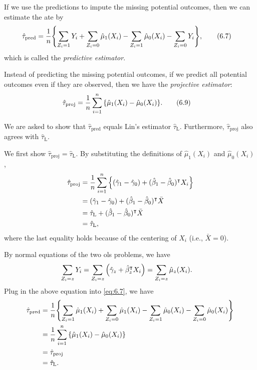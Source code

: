 \documentclass[10pt]{article}
\begin{document}
If we use the predictions to impute the missing potential outcomes,
then we can estimate the \gls{ate} by
\begin{align*}
  \hat{\tau}_{\text{pred}}
  &= \frac{1}{n} 
  {\left\lbrace \sum_{Z_i = 1} Y_i + \sum_{Z_i = 0} \hat{\mu}_1(X_i)
  - \sum_{Z_i = 1} \hat{\mu}_0(X_i) - \sum_{Z_i = 0} Y_i \right\rbrace}, \tag{6.7}
  \label{eq:6.7}
\end{align*}
which is called the \emph{predictive estimator}.

Instead of predicting the missing potential outcomes,
if we predict all potential outcomes even if they are observed,
then we have the \emph{projective estimator}:
\begin{align*}
  \hat{\tau}_{\text{proj}}
  &= \frac{1}{n} \sum_{i=1}^n {\left\lbrace \hat{\mu}_1(X_i) - \hat{\mu}_0(X_i) \right\rbrace}. \tag{6.9}
\end{align*}

We are asked to show that 
$\hat{\tau}_{\text{pred}}$ equals Lin's estimator $\hat{\tau}_{\text{L}}$.
Furthermore, $\hat{\tau}_{\text{proj}}$ also agrees with $\hat{\tau}_{\text{L}}$.

We first show $\hat{\tau}_{\text{proj}} = \hat{\tau}_{\text{L}}$.
By substituting the definitions of $\hat{\mu}_1(X_i)$ and $\hat{\mu}_0(X_i)$,
\begin{align*}
  \hat{\tau}_{\text{proj}}
  &= \frac{1}{n} \sum_{i=1}^n {\left\lbrace (\hat{\gamma}_1 - \hat{\gamma}_0) + (\hat{\beta}_1 - \hat{\beta}_0)^\intercal X_i \right\rbrace} \\
  &= (\hat{\gamma}_1 - \hat{\gamma}_0) + (\hat{\beta}_1 - \hat{\beta}_0)^\intercal \bar{X} \\
  &= \hat{\tau}_{\text{L}} + (\hat{\beta}_1 - \hat{\beta}_0)^\intercal \bar{X} \\
  &= \hat{\tau}_{\text{L}},
\end{align*}
where the last equality holds because of the centering of $X_i$ (i.e., $\bar{X} = 0$).

By normal equations of the two \gls{ols} problems,
we have
\begin{align*}
  \sum_{Z_i = z} Y_i 
  &= \sum_{Z_i = z} {\left( \hat{\gamma}_z + \hat{\beta}_z^\intercal X_i \right)}
  = \sum_{Z_i = z} \hat{\mu}_z(X_i).
\end{align*}
Plug in the above equation into \cref{eq:6.7}, we have
\begin{align*}
  \hat{\tau}_{\text{pred}}
  &= \frac{1}{n} 
  {\left\lbrace \sum_{Z_i = 1} \hat{\mu}_1(X_i) + \sum_{Z_i = 0} \hat{\mu}_1(X_i)
  - \sum_{Z_i = 1} \hat{\mu}_0(X_i) - \sum_{Z_i = 0} \hat{\mu}_0(X_i) \right\rbrace} \\
  &= \frac{1}{n} \sum_{i=1}^n {\left\lbrace \hat{\mu}_1(X_i) - \hat{\mu}_0(X_i) \right\rbrace} \\
  &= \hat{\tau}_{\text{proj}} \\
  &= \hat{\tau}_{\text{L}}.
\end{align*}
\end{document}
